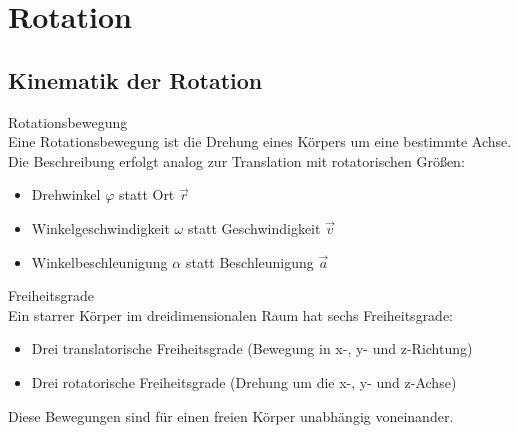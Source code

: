 \section{Rotation}

\subsection{Kinematik der Rotation}

\begin{definition}{Rotationsbewegung}\\
    Eine Rotationsbewegung ist die Drehung eines Körpers um eine bestimmte Achse. Die Beschreibung erfolgt analog zur Translation mit rotatorischen Größen:
    \begin{itemize}
        \item Drehwinkel $\varphi$ statt Ort $\vec{r}$
        \item Winkelgeschwindigkeit $\omega$ statt Geschwindigkeit $\vec{v}$
        \item Winkelbeschleunigung $\alpha$ statt Beschleunigung $\vec{a}$
    \end{itemize}
\end{definition}

\begin{concept}{Freiheitsgrade}\\
    Ein starrer Körper im dreidimensionalen Raum hat sechs Freiheitsgrade:
    \begin{itemize}
        \item Drei translatorische Freiheitsgrade (Bewegung in x-, y- und z-Richtung)
        \item Drei rotatorische Freiheitsgrade (Drehung um die x-, y- und z-Achse)
    \end{itemize}
    Diese Bewegungen sind für einen freien Körper unabhängig voneinander.
\end{concept}

